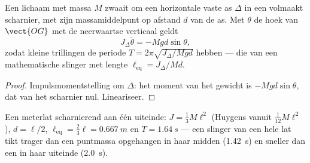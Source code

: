 \begin{proposition}\label{prop:b2:rigid-body-mechanics:pendulum}
Een lichaam met massa $M$ zwaait om een horizontale vaste as $\Delta$ in
een volmaakt scharnier, met zijn massamiddelpunt op afstand $d$ van de as.
Met $\theta$ de hoek van $\vect{OG}$ met de neerwaartse verticaal geldt
\[
J_\Delta\ddot\theta = -Mgd\sin\theta ,
\]
zodat kleine trillingen de periode $T = 2\pi\sqrt{J_\Delta/Mgd}$ hebben
--- die van een mathematische slinger met lengte $\ell_{\text{eq}} = J_\Delta/Md$.
\end{proposition}

\begin{proof}
Impulsmomentstelling om $\Delta$: het moment van het gewicht is
$-Mgd\sin\theta$, dat van het scharnier nul. Lineariseer.
\end{proof}

\begin{example}[De meterlat]\label{ex:b2:rigid-body-mechanics:rule}
Een meterlat scharnierend aan één uiteinde: $J = \tfrac13M\ell^2$ (Huygens
vanuit $\tfrac1{12}M\ell^2$), $d = \ell/2$,
$\ell_{\text{eq}} = \tfrac23\ell =
\qty{0.667}{m}$ en $T = \qty{1.64}{s}$
--- een slinger van een hele lat
tikt trager dan een puntmassa opgehangen in haar midden (\qty{1.42}{s}) en
sneller dan een in haar uiteinde (\qty{2.0}{s}).
\end{example}

